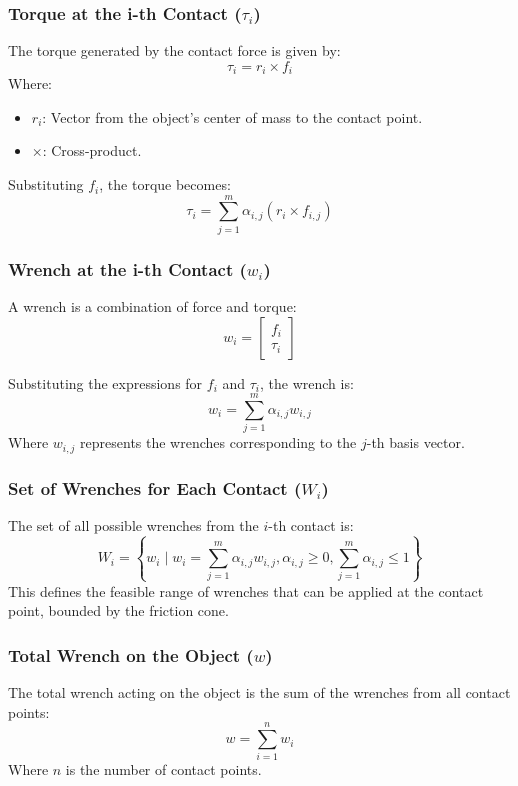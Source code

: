 \documentclass[12pt]{article}
\begin{document}
\subsubsection{Torque at the i-th Contact (\(\tau_i\))}

The torque generated by the contact force is given by:
\[
\tau_i = r_i \times f_i
\]
Where:
\begin{itemize}
    \item \(r_i\): Vector from the object's center of mass to the contact point.
    \item \(\times\): Cross-product.
\end{itemize}

Substituting \(f_i\), the torque becomes:
\[
\tau_i = \sum_{j=1}^{m} \alpha_{i,j} (r_i \times f_{i,j})
\]

\subsubsection{Wrench at the i-th Contact (\(w_i\))}

A wrench is a combination of force and torque:
\[
w_i = \begin{bmatrix}
f_i \\
\tau_i
\end{bmatrix}
\]

Substituting the expressions for \(f_i\) and \(\tau_i\), the wrench is:
\[
w_i = \sum_{j=1}^{m} \alpha_{i,j} w_{i,j}
\]
Where \(w_{i,j}\) represents the wrenches corresponding to the \(j\)-th basis vector.

\subsubsection{Set of Wrenches for Each Contact (\(W_i\))}

The set of all possible wrenches from the \(i\)-th contact is:
\[
W_i = \left\{ w_i \mid w_i = \sum_{j=1}^{m} \alpha_{i,j} w_{i,j}, \alpha_{i,j} \geq 0, \sum_{j=1}^{m} \alpha_{i,j} \leq 1 \right\}
\]
This defines the feasible range of wrenches that can be applied at the contact point, bounded by the friction cone.

\subsubsection{Total Wrench on the Object (\(w\))}

The total wrench acting on the object is the sum of the wrenches from all contact points:
\[
w = \sum_{i=1}^{n} w_i
\]
Where \(n\) is the number of contact points.
\end{document}
